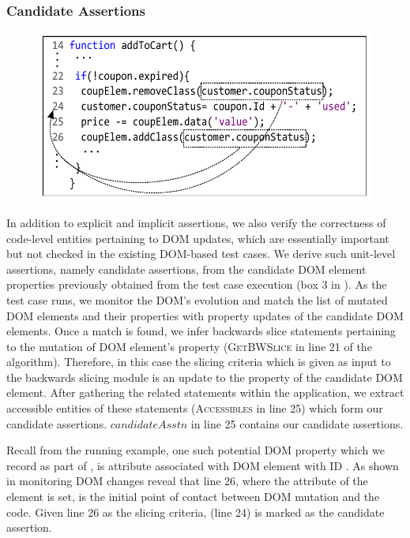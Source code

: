 \subsubsection{Candidate Assertions} \label{Sec:candidateAssertions}
\begin{figure}[!t]
  \centering
  \includegraphics[width=1\hsize]{fig/candidateDOMToCode}
  \vspace{-0.2in} 
  \label{Fig:candidateDOMToCode}
\end{figure}
In addition to explicit and implicit assertions, we also verify the correctness of code-level entities pertaining to DOM updates, which are essentially important but not checked in the existing DOM-based test cases. We derive such unit-level assertions, namely candidate assertions, from the candidate DOM element properties previously obtained from the test case execution (box 3 in ). As the test case runs, we monitor the DOM's evolution and match the list of mutated DOM elements and their properties with property updates of the candidate DOM elements. Once a match is found, we infer backwards slice statements pertaining to the mutation of DOM element's property (\textsc{GetBWSlice} in line 21 of the algorithm). Therefore, in this case the slicing criteria which is given as input to the backwards slicing module is an update to the property of the candidate DOM element.
After gathering the related \javascript statements within the application, we extract accessible entities of these statements (\textsc{Accessibles} in line 25) which form our candidate assertions. $candidateAsstn$ in line 25 contains our candidate assertions. 

Recall from the running example, one such potential DOM property which we record as part of , is  attribute associated with DOM element with ID . As shown in  monitoring DOM changes reveal that line 26, where the  attribute of the element is set, is the initial point of contact between DOM mutation and the \javascript code. Given line 26 as the slicing criteria,  (line 24) is marked as the candidate assertion.